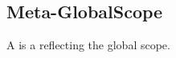 \subsection{Meta-GlobalScope}
\label{concept-Meta-GlobalScope}

A  is a  reflecting the global scope.



